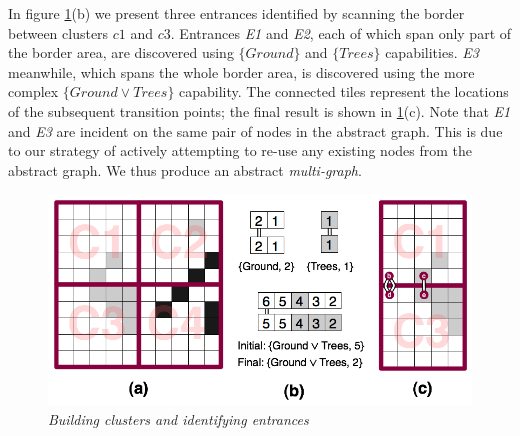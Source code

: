 {In figure \ref{aha-fig:clustersandentrances}(b) we present three entrances identified by scanning the border between clusters $c1$ and $c3$.
Entrances \emph{E1} and \emph{E2}, each of which span only part of the border area, are discovered using $\lbrace Ground \rbrace$ and $\lbrace Trees \rbrace$ capabilities. \emph{E3} meanwhile, which spans the whole border area, is discovered using the more complex $\lbrace Ground \vee Trees \rbrace$ capability. 
The connected tiles represent the locations of the subsequent transition points; the final result is shown in \ref{aha-fig:clustersandentrances}(c). 
Note that \emph{E1} and \emph{E3} are incident on the same pair of nodes in the abstract graph. This is due to our  strategy of actively attempting to re-use any existing nodes from the abstract graph. 
We thus produce an abstract \emph{multi-graph}.

\begin{figure}[htbp]
        \caption{\emph{Building clusters and identifying entrances} }
        \begin{center}
                        \includegraphics[scale=0.25]{diagrams/identifying_entrances.png}
        \end{center}
        \label{aha-fig:clustersandentrances}
\end{figure}

}
